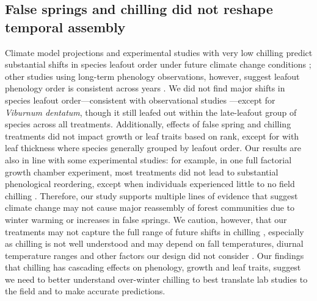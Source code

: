 \documentclass{article}\usepackage[]{graphicx}\usepackage[]{color}
\begin{document}
\subsection*{False springs and chilling did not reshape temporal assembly}
Climate model projections and experimental studies with very low chilling predict substantial shifts in species leafout order under future climate change conditions \citep{Roberts2015, Laube2014}; other studies using long-term phenology observations, however, suggest leafout phenology order is consistent across years \citep{Wesolowski2006}. We did not find major shifts in species leafout order---consistent with observational studies \citep{Wesolowski2006}---except for \textit{Viburnum dentatum}, though it still leafed out within the late-leafout group of species across all treatments. Additionally, effects of false spring and chilling treatments did not impact growth or leaf traits based on rank, except for with leaf thickness where species generally grouped by leafout order. Our results are also in line with some experimental studies: for example, in one full factorial growth chamber experiment, most treatments did not lead to substantial phenological reordering, except when individuals experienced little to no field chilling \citep{Laube2014}. Therefore, our study supports multiple lines of evidence that suggest climate change may not cause major reassembly of forest communities due to winter warming or increases in false springs. We caution, however, that our treatments may not capture the full range of future shifts in chilling \citep[current forecasts for chilling vary highly across regions, see][]{Fraga2019}, especially as chilling is not well understood \citep{Nanninga2017} and may depend on fall temperatures, diurnal temperature ranges and other factors our design did not consider \citep{Dennis2003}. Our findings that chilling has cascading effects on phenology, growth and leaf traits, suggest we need to better understand over-winter chilling to best translate lab studies to the field and to make accurate predictions. 
    
\end{document}
